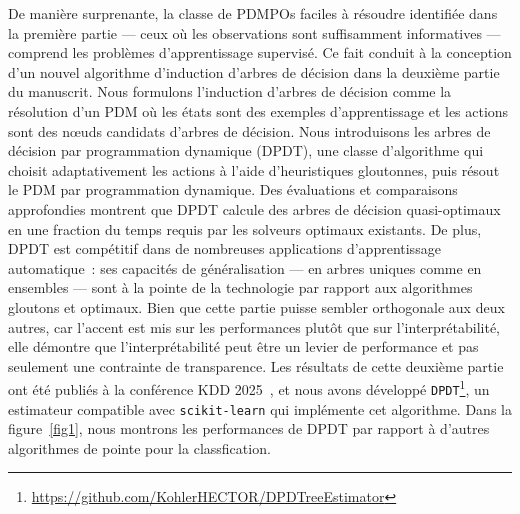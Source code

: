 \documentclass{article}
\begin{document}
De manière surprenante, la classe de PDMPOs faciles à résoudre identifiée dans la première partie --- ceux où les observations sont suffisamment informatives --- comprend les problèmes d'apprentissage supervisé.
Ce fait conduit à la conception d'un nouvel algorithme d'induction d'arbres de décision dans la deuxième partie du manuscrit.
Nous formulons l'induction d'arbres de décision comme la résolution d'un PDM où les états sont des exemples d'apprentissage et les actions sont des nœuds candidats d'arbres de décision.
Nous introduisons les arbres de décision par programmation dynamique (DPDT), une classe d'algorithme qui choisit adaptativement les actions à l'aide d'heuristiques gloutonnes, puis résout le PDM par programmation dynamique.
Des évaluations et comparaisons approfondies montrent que DPDT calcule des arbres de décision quasi-optimaux en une fraction du temps requis par les solveurs optimaux existants.
De plus, DPDT est compétitif dans de nombreuses applications d'apprentissage automatique~: ses capacités de généralisation --- en arbres uniques comme en ensembles --- sont à la pointe de la technologie par rapport aux algorithmes gloutons et optimaux.
Bien que cette partie puisse sembler orthogonale aux deux autres, car l'accent est mis sur les performances plutôt que sur l'interprétabilité, elle démontre que l'interprétabilité peut être un levier de performance et pas seulement une contrainte de transparence.
Les résultats de cette deuxième partie ont été publiés à la conférence KDD 2025~\cite{dpdt}, et nous avons développé \texttt{DPDT}\footnote{\url{https://github.com/KohlerHECTOR/DPDTreeEstimator}}, un estimateur compatible avec \texttt{scikit-learn} qui implémente cet algorithme.
Dans la figure~\ref{fig1}, nous montrons les performances de DPDT par rapport à d'autres algorithmes de pointe pour la classfication.
\end{document}
